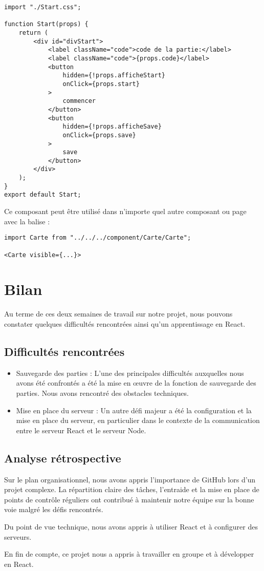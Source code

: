 \documentclass[a4paper]{article}
\begin{document}
\begin{lstlisting}
import "./Start.css";

function Start(props) {
    return (
        <div id="divStart">
            <label className="code">code de la partie:</label>
            <label className="code">{props.code}</label>
            <button
                hidden={!props.afficheStart}
                onClick={props.start}
            >
                commencer
            </button>
            <button
                hidden={!props.afficheSave}
                onClick={props.save}
            >
                save
            </button>
        </div>
    );
}
export default Start;
\end{lstlisting}

Ce composant peut être utilisé dans n'importe quel autre composant ou page avec la balise :
\begin{lstlisting}
import Carte from "../../../component/Carte/Carte";

<Carte visible={...}>
\end{lstlisting}

\section{Bilan}

Au terme de ces deux semaines de travail sur notre projet, nous pouvons constater quelques difficultés rencontrées ainsi qu'un apprentissage en React.

\subsection{Difficultés rencontrées}

\begin{itemize}
\item Sauvegarde des parties : L'une des principales difficultés auxquelles nous avons été confrontés a été la mise en œuvre de la fonction de sauvegarde des parties. Nous avons rencontré des obstacles techniques.
\item Mise en place du serveur : Un autre défi majeur a été la configuration et la mise en place du serveur, en particulier dans le contexte de la communication entre le serveur React et le serveur Node.
\end{itemize}

\subsection{Analyse rétrospective}

Sur le plan organisationnel, nous avons appris l'importance de GitHub lors d'un projet complexe. La répartition claire des tâches, l'entraide et la mise en place de points de contrôle réguliers ont contribué à maintenir notre équipe sur la bonne voie malgré les défis rencontrés.

Du point de vue technique, nous avons appris à utiliser React et à configurer des serveurs.

En fin de compte, ce projet nous a appris à travailler en groupe et à développer en React.
\end{document}
